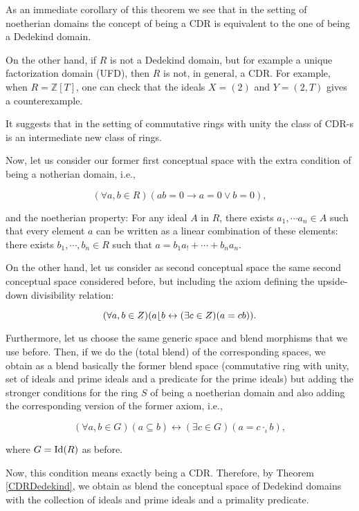 As an immediate corollary of this theorem we see that in the setting of noetherian domains the concept of being a CDR is equivalent to the one of being a Dedekind domain.

\begin{remark}
On the other hand, if $R$ is not a Dedekind domain, but for example a unique factorization domain (UFD), then $R$ is not, in general, a CDR. For example, when $R=\mathbb{Z}[T]$, one can check that the ideals $X=(2)$ and $Y=(2,T)$ gives a counterexample.  

It suggests that in the setting of commutative rings with unity the class of CDR-s is an intermediate new class of rings.
\end{remark}

 Now, let us consider our former first conceptual space with the extra condition of being a notherian domain, i.e., 

\[ (\forall a,b \in R)(ab=0 \rightarrow a=0 \vee b=0),\]

and the noetherian property: For any ideal $A$ in $R$, there exists $a_1,\cdots a_n\in A$ such that every element $a$ can be written as a linear combination of these elements: there exists $b_1, \cdots, b_n \in R$ such that $a=b_1a_!+\cdots +b_na_n$.

On the other hand, let us consider as second conceptual space the same second conceptual space considered before, but including the axiom defining the upside-down divisibility relation:

\[ (\forall a,b\in Z)(a \lfloor b\leftrightarrow (\exists c\in Z)(a=cb)).\]

Furthermore, let us choose the same  generic space and blend morphisms that we use before.
Then, if we do the (total blend) of the corresponding spaces, we obtain as a blend basically the former blend space (commutative ring with unity, set of ideals and prime ideals and a predicate for the prime ideals) but adding the stronger conditions for the ring $S$ of being a  noetherian domain and also adding the corresponding version of the former axiom, i.e., 

\[(\forall a,b \in G)(a \subseteq b)\leftrightarrow (\exists c\in G)(a=c\cdot_{\iota}b),\]

where $G={\rm Id}(R)$ as before.

Now, this condition means exactly being a CDR. Therefore, by Theorem \ref{CDRDedekind}, we obtain as blend the conceptual space of Dedekind domains with the collection of ideals and prime ideals and a primality predicate.

